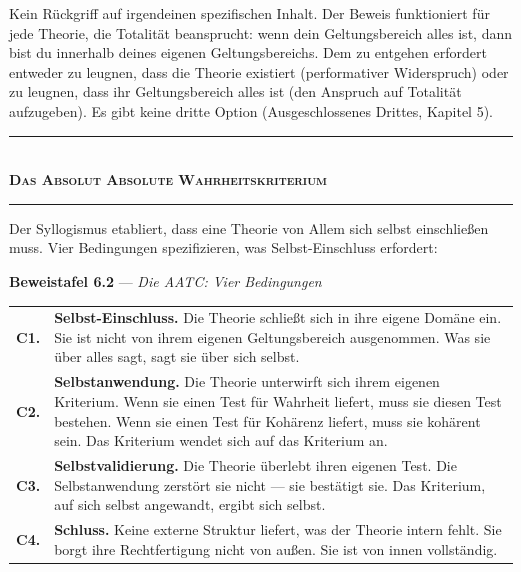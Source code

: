 \documentclass[10pt, openany, oneside]{book}
\renewcommand{\normalsize}{\fontsize{10}{13}\selectfont}
\renewcommand{\footnotesize}{\fontsize{8.5}{11}\selectfont}
\begin{document}
\vspace{0.8em}

\noindent Kein Rückgriff auf irgendeinen spezifischen Inhalt. Der Beweis funktioniert für jede Theorie, die Totalität beansprucht: wenn dein Geltungsbereich alles ist, dann bist du innerhalb deines eigenen Geltungsbereichs. Dem zu entgehen erfordert entweder zu leugnen, dass die Theorie existiert (performativer Widerspruch) oder zu leugnen, dass ihr Geltungsbereich alles ist (den Anspruch auf Totalität aufzugeben). Es gibt keine dritte Option (Ausgeschlossenes Drittes, Kapitel 5).

\vspace{1.5em}


\begin{center}
    \rule{0.3\textwidth}{0.4pt}\\[0.5em]
    {\normalsize\bfseries\scshape Das Absolut Absolute Wahrheitskriterium}\\[0.3em]
    \rule{0.3\textwidth}{0.4pt}
\end{center}

\vspace{1em}

\noindent Der Syllogismus etabliert, dass eine Theorie von Allem sich selbst einschließen muss. Vier Bedingungen spezifizieren, was Selbst-Einschluss erfordert:

\vspace{0.5em}

\textbf{Beweistafel 6.2} --- \textit{Die AATC: Vier Bedingungen}

\vspace{0.5em}

{\footnotesize
\noindent\begin{tabular}{r p{}}
\textbf{C1.} & \textbf{Selbst-Einschluss.} Die Theorie schließt sich in ihre eigene Domäne ein. Sie ist nicht von ihrem eigenen Geltungsbereich ausgenommen. Was sie über alles sagt, sagt sie über sich selbst. \\[0.3em]
\textbf{C2.} & \textbf{Selbstanwendung.} Die Theorie unterwirft sich ihrem eigenen Kriterium. Wenn sie einen Test für Wahrheit liefert, muss sie diesen Test bestehen. Wenn sie einen Test für Kohärenz liefert, muss sie kohärent sein. Das Kriterium wendet sich auf das Kriterium an. \\[0.3em]
\textbf{C3.} & \textbf{Selbstvalidierung.} Die Theorie überlebt ihren eigenen Test. Die Selbstanwendung zerstört sie nicht --- sie bestätigt sie. Das Kriterium, auf sich selbst angewandt, ergibt sich selbst. \\[0.3em]
\textbf{C4.} & \textbf{Schluss.} Keine externe Struktur liefert, was der Theorie intern fehlt. Sie borgt ihre Rechtfertigung nicht von außen. Sie ist von innen vollständig. \\[0.3em]
\end{tabular}
}
\end{document}
